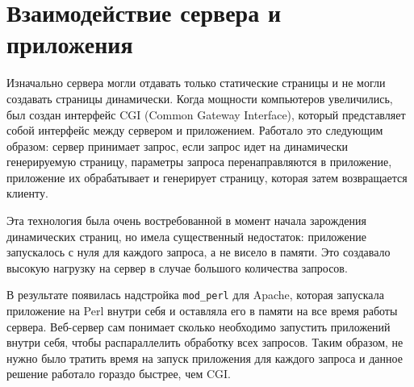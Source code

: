 \section{Взаимодействие сервера и приложения} %
Изначально сервера могли отдавать только статические страницы и не могли создавать страницы динамически. Когда мощности компьютеров увеличились, был создан интерфейс CGI (Common Gateway Interface), который представляет собой интерфейс между сервером и приложением. Работало это следующим образом: сервер принимает запрос, если запрос идет на динамически генерируемую страницу, параметры запроса перенаправляются в приложение, приложение их обрабатывает и генерирует страницу, которая затем возвращается клиенту.

Эта технология была очень востребованной в момент начала зарождения динамических страниц, но имела существенный недостаток: приложение запускалось с нуля для каждого запроса, а не висело в памяти. Это создавало высокую нагрузку на сервер в случае большого количества запросов.

В результате появилась надстройка \verb|mod_perl| для Apache, которая запускала приложение на Perl внутри себя и оставляла его в памяти на все время работы сервера.
Веб-сервер сам понимает сколько необходимо запустить приложений внутри себя, чтобы распараллелить обработку всех запросов.
Таким образом, не нужно было тратить время на запуск приложения для каждого запроса и данное решение работало гораздо быстрее, чем CGI.

